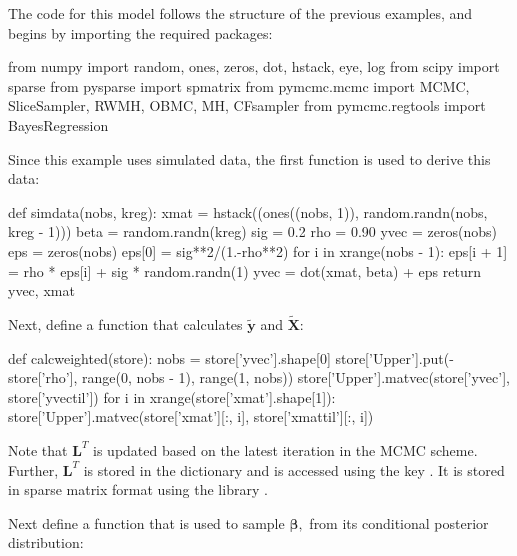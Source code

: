 \documentclass[article]{jss}
\begin{document}
The code for this model follows the structure of the previous
examples, and begins by importing the required packages:




\begin{Code}
from numpy import random, ones, zeros, dot, hstack, eye, log
from scipy import sparse
from pysparse import spmatrix
from pymcmc.mcmc import MCMC, SliceSampler, RWMH, OBMC, MH, CFsampler
from pymcmc.regtools import BayesRegression 
\end{Code}

Since this example uses simulated data, the first function is used to
derive this data:

\begin{Code}
def simdata(nobs, kreg):
    xmat = hstack((ones((nobs, 1)), random.randn(nobs, kreg - 1)))
    beta = random.randn(kreg)
    sig = 0.2
    rho = 0.90
    yvec = zeros(nobs)
    eps = zeros(nobs)
    eps[0] = sig**2/(1.-rho**2)
    for i in xrange(nobs - 1):
        eps[i + 1] = rho * eps[i] + sig * random.randn(1)
    yvec = dot(xmat, beta) + eps
    return yvec, xmat
\end{Code}

Next, define a function that calculates $\tilde{\bm{y}}$ and
$\bm{\tilde{X}}$:


\begin{Code}
def calcweighted(store):
    nobs = store['yvec'].shape[0]
    store['Upper'].put(-store['rho'], range(0, nobs - 1), range(1, nobs))
    store['Upper'].matvec(store['yvec'], store['yvectil'])
    for i in xrange(store['xmat'].shape[1]):
        store['Upper'].matvec(store['xmat'][:, i], store['xmattil'][:, i])

\end{Code}
 Note that $\bm{L}^{T}$ is updated based on the
latest iteration in the MCMC scheme. Further, $\bm{L}^{T}$ is stored
in the  dictionary  and is accessed using
the key . It is stored in sparse matrix format using the
library .

Next define a function that is used to sample $\bm{\beta},$ from its
conditional posterior distribution:
\end{document}
